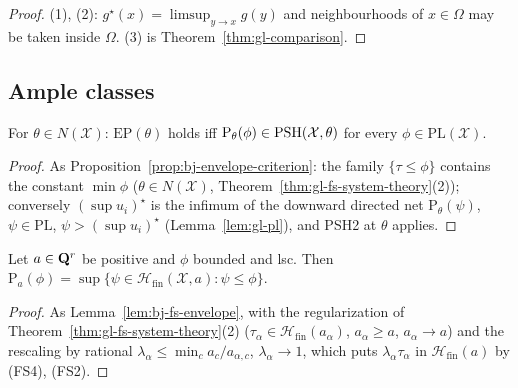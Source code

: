 \begin{proof}
(1), (2): $g^\star(x)=\limsup_{y\to x}g(y)$ and neighbourhoods of $x\in\Omega$ may be taken inside $\Omega$. (3) is Theorem~\ref{thm:gl-comparison}.
\end{proof}

\subsection{Ample classes}\label{subsec:gl-ample}

\begin{proposition}\label{prop:gl-pl-envelope}
\leanok
{}
For $\theta\in N(\mathcal X)$: $\mathrm{EP}(\theta)$ holds iff $\mathrm P_\theta(\phi)\in\operatorname{PSH}(\mathcal X,\theta)$ for every $\phi\in\mathrm{PL}(\mathcal X)$.
\end{proposition}

\begin{proof}
As Proposition~\ref{prop:bj-envelope-criterion}: the family $\{\tau\le\phi\}$ contains the constant $\min\phi$ ($\theta\in N(\mathcal X)$,
Theorem~\ref{thm:gl-fs-system-theory}(2)); conversely $(\sup u_i)^\star$ is the infimum of the downward directed net $\mathrm P_\theta(\psi)$, $\psi\in\mathrm{PL}$,
$\psi>(\sup u_i)^\star$ (Lemma~\ref{lem:gl-pl}), and PSH2 at $\theta$ applies.
\end{proof}

\begin{lemma}\label{lem:gl-fs-envelope}
\leanok
{}
Let $a\in\mathbf{Q}^r$ be positive and $\phi$ bounded and lsc. Then $\mathrm P_a(\phi)=\sup\{\psi\in\mathcal H_{\mathrm{fin}}(\mathcal X,a):\psi\le\phi\}$.
\end{lemma}

\begin{proof}
As Lemma~\ref{lem:bj-fs-envelope}, with the regularization of Theorem~\ref{thm:gl-fs-system-theory}(2) ($\tau_\alpha\in\mathcal H_{\mathrm{fin}}(a_\alpha)$,
$a_\alpha\ge a$, $a_\alpha\to a$) and the rescaling by rational $\lambda_\alpha\le\min_ca_c/a_{\alpha,c}$, $\lambda_\alpha\to1$, which puts $\lambda_\alpha\tau_\alpha$ in
$\mathcal H_{\mathrm{fin}}(a)$ by (FS4), (FS2).
\end{proof}


